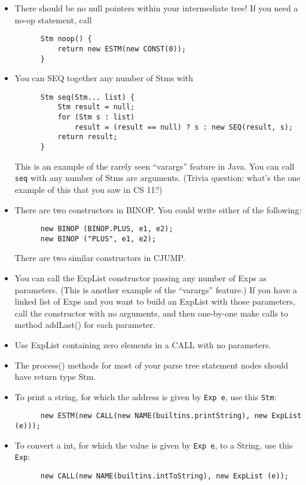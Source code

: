 \documentclass[11pt]{article}
\begin{document}
\begin{itemize}
\item There should be no null pointers within your intermediate tree!  If you need a no-op statement, call
\begin{verbatim}
      Stm noop() {
          return new ESTM(new CONST(0));
      }
\end{verbatim}

\item You can SEQ together any number of Stms with
\begin{verbatim}
      Stm seq(Stm... list) {
          Stm result = null;
          for (Stm s : list)
              result = (result == null) ? s : new SEQ(result, s);
          return result;
      }
\end{verbatim}
This is an example of the rarely seen ``varargs'' feature in Java.  You can call \verb'seq' with any number of Stms are arguments.  (Trivia question:  what's the one example of this that you saw in CS 11?)

\item There are two constructors in BINOP.  You could write either of the following:
\begin{verbatim}
      new BINOP (BINOP.PLUS, e1, e2);
      new BINOP ("PLUS", e1, e2);
\end{verbatim}
There are two similar constructors in CJUMP.

\item You can call the ExpList constructor passing any number of Exps as parameters.  (This is another example of the ``varargs'' feature.)  If you have a linked list of Exps and you want to build an ExpList with those parameters, call the constructor with no arguments, and then one-by-one make calls to method addLast() for each parameter.

\item Use ExpList containing zero elements in a CALL with no parameters.

\item The process() methods for most of your parse tree statement nodes should have return type Stm.

\item To print a string, for which the address is given by \verb'Exp e', use this \verb'Stm':
\begin{verbatim}
      new ESTM(new CALL(new NAME(builtins.printString), new ExpList (e)));
\end{verbatim}

\item To convert a int, for which the value is given by \verb'Exp e', to a String, use this \verb'Exp':
\begin{verbatim}
      new CALL(new NAME(builtins.intToString), new ExpList (e));
\end{verbatim}


\end{itemize}
\end{document}
